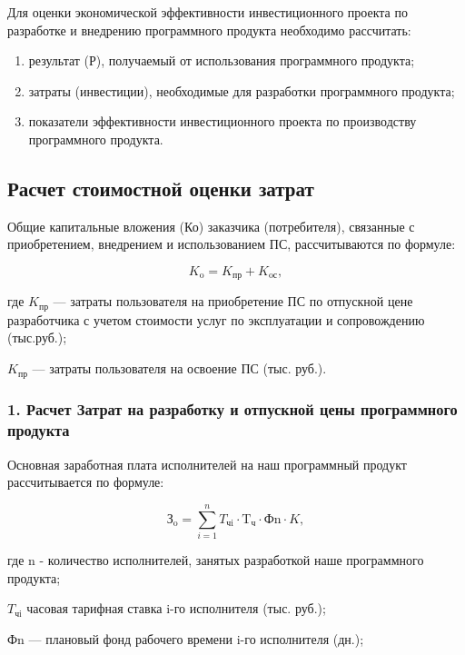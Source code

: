 Для оценки экономической эффективности инвестиционного проекта по разработке и внедрению программного продукта необходимо рассчитать:
\begin{enumerate}
    \item результат (Р), получаемый от использования программного продукта;
    \item затраты (инвестиции), необходимые для разработки программного продукта;
    \item показатели эффективности инвестиционного проекта по производству программного продукта.
\end{enumerate}

\subsection{Расчет стоимостной оценки затрат}

Общие капитальные вложения (Ко) заказчика (потребителя), связанные с приобретением, внедрением и использованием ПС, рассчитываются по формуле:

\begin{displaymath}
  K_{\text{o}} = K_{\text{пр}} + K_{\text{oс}},
\end{displaymath}

где \( K_{\text{пр}} \) --- затраты пользователя на приобретение ПС по отпускной цене разработчика с учетом стоимости услуг по эксплуатации и сопровождению (тыс.руб.);

\( K_{\text{пр}} \) --- затраты пользователя на освоение ПС (тыс. руб.).

\subsubsection{1. Расчет Затрат на разработку и отпускной цены программного продукта}

Основная заработная плата исполнителей на наш программный продукт рассчитывается по формуле:

\begin{displaymath}
  \text{З}_{\text{o}} = \sum\limits_{i=1}^n T_{\text{чi}} \cdot \text{T}_{\text{ч}} \cdot \text{Ф}{\text{n}} \cdot K,
\end{displaymath}

где n - количество исполнителей, занятых разработкой наше программного продукта;      

\( T_{\text{чi}} \) часовая тарифная ставка i-го исполнителя (тыс. руб.);

\( \text{Ф}{\text{n}} \) --- плановый фонд рабочего времени i-го исполнителя (дн.);

